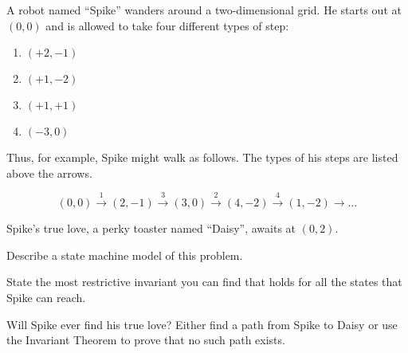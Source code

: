 \documentclass[handout]{mcs}
\begin{document}
\begin{problem}
 A robot named ``Spike'' wanders around a two-dimensional
grid.  He starts out at $(0,0)$ and is allowed to take four different
types of step:

\begin{enumerate}
\item $(+2,-1)$
\item $(+1,-2)$
\item $(+1,+1)$ 
\item $(-3,0)$ 
\end{enumerate}

Thus, for example, Spike might walk as follows.  The types of his
steps are listed above the arrows.

\[
(0,0) \stackrel{1}{\rightarrow}
(2,-1) \stackrel{3}{\rightarrow}
(3,0) \stackrel{2}{\rightarrow}
(4,-2) \stackrel{4}{\rightarrow}
(1,-2) \rightarrow \ldots
\]

Spike's true love, a perky toaster named ``Daisy'', awaits at $(0,2)$.

\begin{problemparts}

\problempart Describe a state machine model of this problem.

\problempart State the most restrictive invariant you can find that
holds for all the states that Spike can reach.

\problempart Will Spike ever find his true love?  Either find a path
from Spike to Daisy or use the Invariant Theorem to prove that no such
path exists.

\end{problemparts}

\end{problem}

\end{document}
